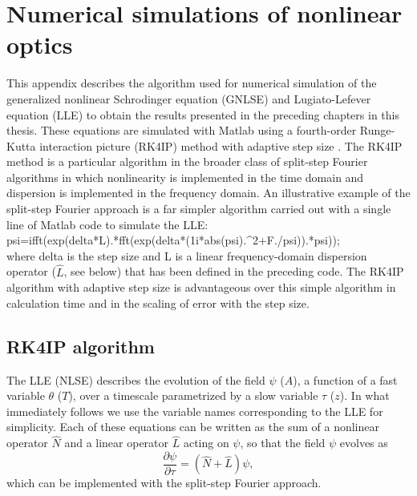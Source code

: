 \chapter{Numerical simulations of nonlinear optics}
 \label{app:numericalsims}



This appendix describes the algorithm used for numerical simulation of the generalized nonlinear Schrodinger equation (GNLSE) and Lugiato-Lefever equation (LLE) to obtain the results presented in the preceding chapters in this thesis. These equations are simulated with Matlab using a fourth-order Runge-Kutta interaction picture (RK4IP) method \cite{Hult2007} with adaptive step size \cite{Heidt2009}. The RK4IP method is a particular algorithm in the broader class of split-step Fourier algorithms in which nonlinearity is implemented in the time domain and dispersion is implemented in the frequency domain. An illustrative example of the split-step Fourier approach is a far simpler algorithm carried out with a single line of Matlab code to simulate the LLE: \\
{\selectfont psi=ifft(exp(delta*L).*fft(exp(delta*(1i*abs(psi).\string^2+F./psi)).*psi));}\\
where {\selectfont delta} is the step size and  {\selectfont L} is a linear frequency-domain dispersion operator ($\hat{L}$, see below) that has been defined in the preceding code. The RK4IP algorithm with adaptive step size is advantageous over this simple algorithm in calculation time and in the scaling of error with the step size.

\section{RK4IP algorithm}

The LLE (NLSE) describes the evolution of the field $\psi$ ($A$), a function of a fast variable $\theta$ ($T$), over a timescale parametrized by a slow variable $\tau$ ($z$). In what immediately follows we use the variable names corresponding to the LLE for simplicity. Each of these equations can be written as the sum of a nonlinear operator $\hat{N}$ and a linear operator $\hat{L}$ acting on $\psi$, so that the field $\psi$ evolves as
\begin{equation}
\frac{\partial\psi}{\partial\tau}=(\hat{N}+\hat{L})\psi,
\end{equation}
which can be implemented with the split-step Fourier approach.

